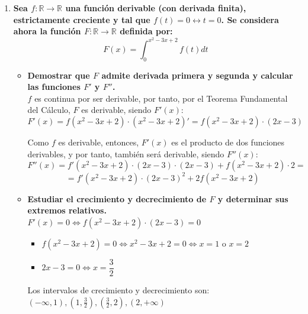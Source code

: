 \documentclass[12pt,a4paper, reqno]{article}
\begin{document}
\begin{enumerate}
    Deshaciendo la recurrencia: \\

    $r_n=(3-2\sqrt{2})r_{n-1}= (3-2\sqrt{2})^2r_{n-2}=...=(3-2\sqrt{2})^{n-1}r_{1}$ $\forall n \in \mathbb{N}$\\

    Por tanto, $r_{10}= (3-2\sqrt{2})^9 \cdot 1 = (3-2\sqrt{2})^9$


     \item %
    \textbf{Sea $f: \mathbb{R} \rightarrow \mathbb{R}$ una función derivable (con derivada finita), estrictamente creciente y tal que $f(t)=0 \leftrightarrow t=0$. Se considera ahora la función $F: \mathbb{R} \rightarrow \mathbb{R}$ definida por: }
    $$F(x)=\int_0^{x^2-3x+2} f(t)dt$$
    \begin{itemize}
        \item [a)] \textbf{Demostrar que $F$ admite derivada primera y segunda y calcular las funciones $F'$ y $F''$.}\\

        $f$ es continua por ser derivable, por tanto, por el Teorema Fundamental del Cálculo, $F$ es derivable, siendo $F'(x)$:\\
        $$F'(x)=f(x^2-3x+2)\cdot (x^2-3x+2)'=f(x^2-3x+2) \cdot (2x-3)$$

        Como $f$ es derivable, entonces, $F'(x)$ es el producto de dos funciones derivables, y por tanto, también será derivable, siendo $F''(x)$:
        $$F''(x)=f'(x^2-3x+2) \cdot (2x-3) \cdot (2x-3) + f(x^2-3x+2) \cdot 2=$$
        $$=f'(x^2-3x+2) \cdot (2x-3)^2+2f(x^2-3x+2)$$

        \item [b)] \textbf{Estudiar el crecimiento y decrecimiento de $F$ y determinar sus extremos relativos. }\\

        $F'(x)=0 \Leftrightarrow f(x^2-3x+2) \cdot (2x-3)=0$
        \begin{itemize}
            \item $f(x^2-3x+2)=0 \Leftrightarrow x^2-3x+2=0 \Leftrightarrow x=1 \text{ o } x=2$
            \item $2x-3=0 \Leftrightarrow x= \dfrac{3}{2}$
        \end{itemize}

        Los intervalos de crecimiento y decrecimiento son: $(- \infty, 1), (1, \frac{3}{2}), (\frac{3}{2}, 2), (2, + \infty)$\\


\end{itemize}
\end{enumerate}
\end{document}

